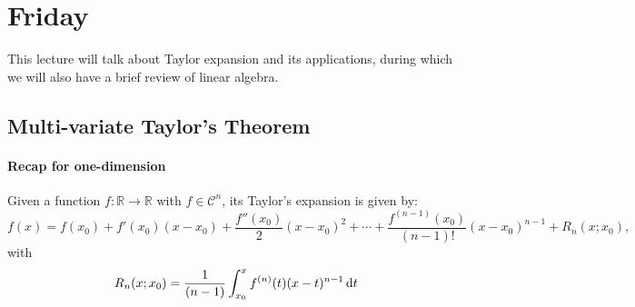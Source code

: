 \section{Friday}
This lecture will talk about Taylor expansion and its applications, during which we will also have a brief review of linear algebra.
\subsection{Multi-variate Taylor's Theorem}
\paragraph{Recap for one-dimension}
Given a function $f:\mathbb{R}\to\mathbb{R}$ with $f\in\mathcal{C}^n$, its Taylor's expansion is given by:
\[
f(x) = f(x_0)+f'(x_0)(x-x_0)+\frac{f''(x_0)}{2}(x-x_0)^2+
\cdots
+\frac{f^{(n-1)}(x_0)}{(n-1)!}(x-x_0)^{n-1}+R_n(x;x_0),
\]
with 
\[
R_n(x;x_0)=\frac{1}{(n-1)}\int_{x_0}^xf^{(n)}(t)(x-t)^{n-1}\,\mathrm{d} t
\]

